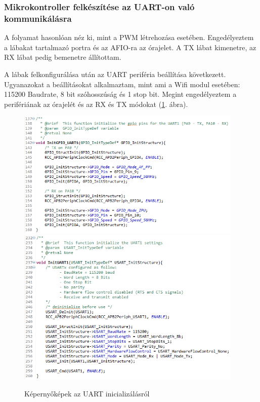 \documentclass[../main.tex]{subfiles}
\begin{document}
        \subsubsection{Mikrokontroller felkészítése az UART-on való kommunikálásra}
            A folyamat hasonlóan néz ki, mint a PWM létrehozása esetében. Engedélyeztem a lábakat tartalmazó portra és az AFIO-ra az órajelet. A TX lábat kimenetre, az RX lábat pedig bemenetre állítottam.
            
            A lábak felkonfigurálása után az UART periféria beállítása következett. Ugyanazokat a beállításokat alkalmaztam, mint ami a Wifi modul esetében: 115200 Baudrate, 8 bit szóhosszúság és 1 stop bit. Megint engedélyeztem a perifériának az órajelét és az RX és TX módokat (\ref{fig:uart_init}. ábra).  
            \begin{figure}[h!]
                \centering
                    \includegraphics[width=10.8cm]{mbed_res/uart_init_gpio}
                    \includegraphics[width=10.8cm]{mbed_res/uart_init}
                \caption{Képernyőképek az UART inicializálásról}
                \label{fig:uart_init}
            \end{figure}
            
\end{document}
